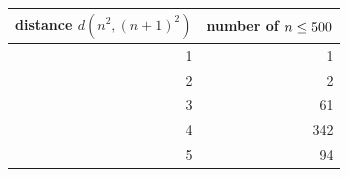 \begin{tabular}{rr}\toprule distance $d(n^2,(n+1)^2)$ & number of $n\le500$\\\midrule
1 & 1 \\
2 & 2 \\
3 & 61 \\
4 & 342 \\
5 & 94 \\
\bottomrule\end{tabular}
